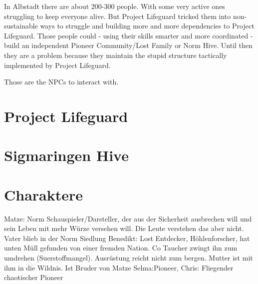 In Albstadt there are about 200-300 people. With some very active ones struggling to keep everyone alive. But Project Lifeguard tricked them into non-sustainable ways to struggle and building more and more dependencies to Project Lifeguard. Those people could - using their skills smarter and more coordinated - build an independent Pioneer Community/Lost Family or Norm Hive. Until then they are a problem because they maintain the stupid structure tactically implemented by Project Lifeguard.

Those are the NPCs to interact with.


\section{Project Lifeguard}


\section{Sigmaringen Hive}


\section{Charaktere}

Matze: Norm Schauspieler/Darsteller, der aus der Sicherheit ausbrechen will und sein Leben mit mehr Würze versehen will. Die Leute verstehen das aber nicht. Vater blieb in der Norm Siedlung
Benedikt: Lost Entdecker, Höhlenforscher, hat unten Müll gefunden von einer fremden Nation. Co Taucher zwingt ihn zum umdrehen (Suerstoffmangel). Ausrüstung reicht nicht zum bergen. Mutter ist mit ihm in die Wildnis. Ist Bruder von Matze
Selma:Pioneer, 
Chris: Fliegender chaotischer Pioneer